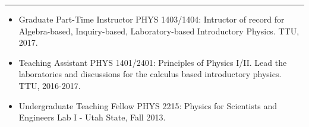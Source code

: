 \documentclass[letterpaper,10pt]{article}
\begin{document}
\hrule
\vspace{.3 cm}


\begin{itemize}[label=$\blacktriangleright$]
\item   Graduate Part-Time Instructor PHYS 1403/1404: Intructor of record for Algebra-based, Inquiry-based, Laboratory-based Introductory Physics. TTU, 2017.  
 
 \item   Teaching Assistant  PHYS 1401/2401: Principles of Physics I/II. Lead the laboratories and discussions for the calculus based introductory physics. TTU, 2016-2017.
  

 \item Undergraduate Teaching Fellow  PHYS 2215: Physics for Scientists and Engineers Lab I -  Utah State, Fall 2013.
  \end{itemize}
  
  \begin{comment}
  
\begin{itemize}[label=$\blacktriangleright$]

	\item \emph{Graduate Part-Time Instructor} PHYS 1403/1404: Algebra-based, Inquiry-based, Laboratory-based Introductory Physics Curriculum. TTU, 2017-Present.  
	
	

	
\item \emph{Teaching Assistant.}  PHYS 1401/2401: Principles of Physics I/II. Lead the laboratories and discussions for the calculus based introductory physics. TTU, 2016-2017.  
  	  

  \item \emph{Undergraduate Teaching Fellow.}  PHYS 2215: Physics for Scientists and Engineers Lab I -  Utah State, Fall 2013.
  \end{itemize}


\end{comment}
\end{document}
